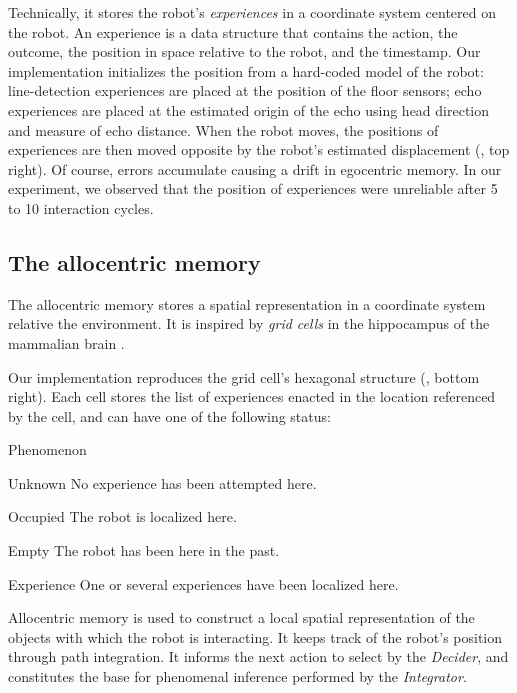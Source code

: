 \documentclass[pmlr]{jmlr}%
\begin{document}
Technically, it stores the robot's \textit{experiences} in a coordinate system centered on the robot.
An experience is a data structure that contains the action, the outcome, the position in space relative to the robot, and the timestamp. 
Our implementation initializes the position from a hard-coded model of the robot: line-detection experiences are placed at the position of the floor sensors; echo experiences are placed at the estimated origin of the echo using head direction and measure of echo distance.  
When the robot moves, the positions of experiences are then moved opposite by the robot's estimated displacement (, top right). 
Of course, errors accumulate causing a drift in egocentric memory. 
In our experiment, we observed that the position of experiences were unreliable after 5 to 10 interaction cycles.


\subsection{The allocentric memory}

The allocentric memory stores a spatial representation in a coordinate system relative the environment. 
It is inspired by \textit{grid cells} in the hippocampus of the mammalian brain \citep{grieves_representation_2017}.

Our implementation reproduces the grid cell's hexagonal structure (, bottom right). 
Each cell stores the list of experiences enacted in the location referenced by the cell, and can have one of the following status:

\begin{altdescription}{Phenomenon}
	\item[Unknown] No experience has been attempted here.
	\item[Occupied] The robot is localized here.
	\item[Empty] The robot has been here in the past.
	\item[Experience] One or several experiences have been localized here.
\end{altdescription}

Allocentric memory is used to construct a local spatial representation of the objects with which the robot is interacting.
It keeps track of the robot's position through path integration. 
It informs the next action to select by the \textit{Decider}, and constitutes the base for phenomenal inference performed by the \textit{Integrator}. 
\end{document}
